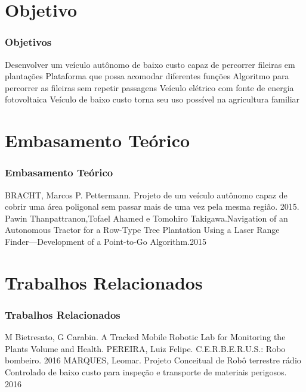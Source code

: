 \documentclass{beamer}
\begin{document}
\section[Objetivo]{Objetivo}

\begin{frame}
\frametitle{Objetivos}
\begin{outline}
 \1 Desenvolver um veículo autônomo de baixo custo capaz de percorrer fileiras em plantações
 \2 Plataforma que possa acomodar diferentes funções
 \2 Algoritmo para percorrer as fileiras sem repetir passagens
 \2 Veículo elétrico com fonte de energia fotovoltaica
 \2 Veículo de baixo custo torna seu uso possível na agricultura familiar
\end{outline}

\justifying
\Large
\end{frame}
\section[Embasamento]{Embasamento Teórico}

\begin{frame}
\frametitle{Embasamento Teórico}
\begin{outline}
\1 BRACHT, Marcos P. Pettermann. Projeto de um veículo autônomo capaz de cobrir uma área poligonal sem passar mais de uma vez pela mesma região. 2015.
\1 Pawin Thanpattranon,Tofael Ahamed e Tomohiro Takigawa.Navigation of an Autonomous Tractor for a Row-Type Tree Plantation Using a Laser Range Finder—Development of a Point-to-Go Algorithm.2015

\end{outline}

\justifying
\Large
\end{frame}
\section[Trabalhos]{Trabalhos Relacionados}

\begin{frame}
\frametitle{Trabalhos Relacionados}
\begin{outline}
 \1 M Bietresato, G Carabin. A Tracked Mobile Robotic Lab for Monitoring the Plants Volume and Health. 
 \1 PEREIRA, Luiz Felipe. C.E.R.B.E.R.U.S.: Robo bombeiro. 2016
 \1 MARQUES, Leomar. Projeto Conceitual de Robô terrestre rádio Controlado de baixo custo para inspeção e transporte de materiais perigosos. 2016
\end{outline}

\justifying
\Large
\end{frame}
\end{document}
